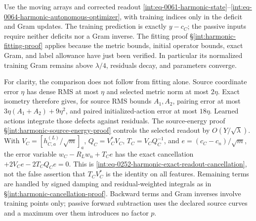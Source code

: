 Use the moving arrays and corrected readout
\eqref{int:eq-0061-harmonic-state}--\eqref{int:eq-0064-harmonic-autonomous-optimizer},
with training indices only in the deficit and Gram updates.  The
training prediction is exactly \(y-c_C\); the passive inputs require
neither deficits nor a Gram inverse.  The fitting proof
\S\ref{int:harmonic-fitting-proof} applies because the metric bounds,
initial operator bounds, exact Gram, and label allowance have just
been verified.  In particular its normalized training Gram remains
above \(\lambda/4\), residuals decay, and parameters converge.

For clarity, the comparison does not follow from fitting alone.
Source coordinate error \(\eta\) has dense RMS at most \(\eta\)
and selected metric norm at most \(2\eta\).  Exact isometry therefore
gives, for source RMS bounds \(A_1,A_2\), pairing error at most
\(3\eta(A_1+A_2)+9\eta^2\), and paired initialized-action error
at most \(18\eta\).  Learned actions integrate those defects
against residuals.  The source-energy proof
\S\ref{int:harmonic-source-energy-proof} controls the selected readout
by \(O(Y/\sqrt\lambda)\).  With
\(V_C=[h_{C,a}^{(L)}/\sqrt m]_a\),
\(Q_C=V_C^*V_C\), \(T_C=V_CQ_C^{-1}\), and
\(e=(c_C-c_n)/\sqrt m\), the error variable
\(w_C-R_Lw_n+T_Ce\) has the exact cancellation
\(+2V_Ce-2T_CQ_Ce=0\).
This is \eqref{int:eq-0252-harmonic-exact-readout-cancellation}, not
the false assertion that \(T_CV_C^*\) is the identity on all features.
Remaining terms are handled by signed damping and residual-weighted
integrals as in \S\ref{int:harmonic-cancellation-proof}.
Backward terms and Gram inverses involve training points only;
passive forward subtraction uses the declared source curves and a
maximum over them introduces no factor \(p\).

